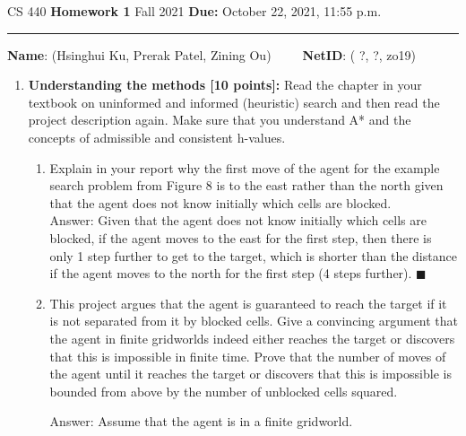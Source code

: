 \documentclass[12pt]{article}
\begin{document}
\noindent
CS 440 \hfill \textbf{Homework 1} \newline 
{Fall 2021} \hfill \textbf{Due:} October 22, 2021, 11:55 p.m.

\noindent
\rule{\linewidth}{0.4pt}

\vspace{.5cm}

\textbf{Name}: ({\color{blue}Hsinghui Ku, Prerak Patel, Zining Ou})~~~~~\textbf{NetID}: ({\color{blue} ?, ?, zo19})

\vspace{.5cm}



\begin{enumerate}

  \item \textbf{Understanding the methods [10 points]:} Read the chapter in your textbook on uninformed and informed (heuristic) search and then read the project description again. Make sure that you understand A* and the concepts of admissible and consistent h-values.
  \begin{enumerate}
  	\item Explain in your report why the first move of the agent for the example search problem from Figure 8 is to the east rather than the north given that the agent does not know initially which cells are blocked. \\
	
	{\color{blue}Answer: 
	Given that the agent does not know initially which cells are blocked, if the agent moves to the east for the first step, then there is only 1 step further to get to the target, which is shorter than the distance if the agent moves to the north for the first step (4 steps further).
	$\blacksquare$
	\\
	}

	\item This project argues that the agent is guaranteed to reach the target if it is not separated from it by blocked cells. Give a convincing argument that the agent in finite gridworlds indeed either reaches the target or discovers that this is impossible in finite time. Prove that the number of moves of the agent until it reaches the target or discovers that this is impossible is bounded from above by the number of unblocked cells squared.\\
		
	{\color{blue}Answer: 
	Assume that the agent is in a finite gridworld.
	
}
\end{enumerate}
\end{enumerate}
\end{document}

